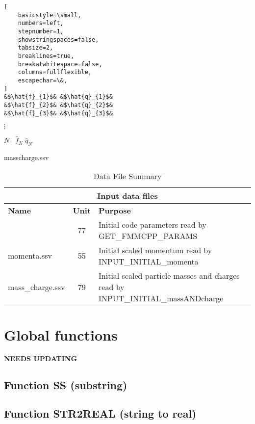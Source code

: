 \documentclass[oneside,12pt]{book}
\begin{document}
\begin{datafile}
\begin{lstlisting}[
    basicstyle=\small,
    numbers=left,
    stepnumber=1,
    showstringspaces=false,
    tabsize=2,
    breaklines=true,
    breakatwhitespace=false,
    columns=fullflexible,
    escapechar=\&,    
]
&$\hat{f}_{1}$& &$\hat{q}_{1}$&
&$\hat{f}_{2}$& &$\hat{q}_{2}$&
&$\hat{f}_{3}$& &$\hat{q}_{3}$&
\end{lstlisting}
\vspace*{-1ex}

\hspace*{2ex}$\vdots$

\hspace*{-3.5ex}$N$ \ $\hat{f}_{N}$ $\hat{q}_{N}$
\caption{masscharge.ssv}
\label{df:masscharge.ssv}
\end{datafile}





\begin{table}
\begin{tabular}{|l|c|p{4.5in}|}
\hline
\multicolumn{3}{|c|}{\bf Input data files}\\
\hline
{\bf Name} & {\bf Unit} & {\bf Purpose}\\
\hline
\nameref{df:phad-mpi.input} & 77 & Initial code parameters read by GET{\_}FMMCPP{\_}PARAMS\\
\hline
momenta.ssv & 55 & Initial scaled momentum read by INPUT{\_}INITIAL{\_}momenta\\
\hline
mass{\_}charge.ssv & 79 & Initial scaled particle masses and charges read by \mbox{INPUT{\_}INITIAL{\_}massANDcharge}\\
\hline

\end{tabular}
\caption{Data File Summary}
\label{table:DatFileSum}
\end{table}



\section{Global functions}

{\bf\color{red} NEEDS UPDATING}

\subsection{Function SS (substring)}

\subsection{Function STR2REAL (string to real)}
\end{document}
